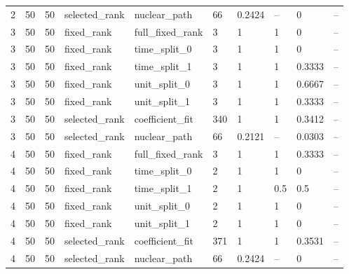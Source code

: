 \begin{longtable}{llllllllll}
2 & 50 & 50 & selected\_rank & nuclear\_path & 66 & 0.2424 & -- & 0 & -- \\
3 & 50 & 50 & fixed\_rank & full\_fixed\_rank & 3 & 1 & 1 & 0 & -- \\
3 & 50 & 50 & fixed\_rank & time\_split\_0 & 3 & 1 & 1 & 0 & -- \\
3 & 50 & 50 & fixed\_rank & time\_split\_1 & 3 & 1 & 1 & 0.3333 & -- \\
3 & 50 & 50 & fixed\_rank & unit\_split\_0 & 3 & 1 & 1 & 0.6667 & -- \\
3 & 50 & 50 & fixed\_rank & unit\_split\_1 & 3 & 1 & 1 & 0.3333 & -- \\
3 & 50 & 50 & selected\_rank & coefficient\_fit & 340 & 1 & 1 & 0.3412 & -- \\
3 & 50 & 50 & selected\_rank & nuclear\_path & 66 & 0.2121 & -- & 0.0303 & -- \\
4 & 50 & 50 & fixed\_rank & full\_fixed\_rank & 3 & 1 & 1 & 0.3333 & -- \\
4 & 50 & 50 & fixed\_rank & time\_split\_0 & 2 & 1 & 1 & 0 & -- \\
4 & 50 & 50 & fixed\_rank & time\_split\_1 & 2 & 1 & 0.5 & 0.5 & -- \\
4 & 50 & 50 & fixed\_rank & unit\_split\_0 & 2 & 1 & 1 & 0 & -- \\
4 & 50 & 50 & fixed\_rank & unit\_split\_1 & 2 & 1 & 1 & 0 & -- \\
4 & 50 & 50 & selected\_rank & coefficient\_fit & 371 & 1 & 1 & 0.3531 & -- \\
4 & 50 & 50 & selected\_rank & nuclear\_path & 66 & 0.2424 & -- & 0 & -- \\
\bottomrule
\end{longtable}
\endgroup
